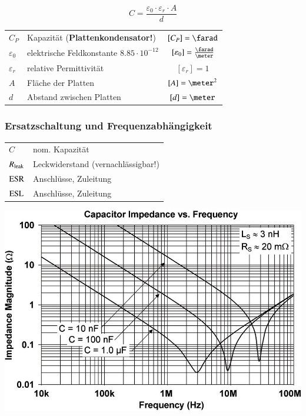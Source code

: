 \begin{minipage}[c]{0.20\columnwidth}
    $$ \boxed{C = \frac{\varepsilon_0 \cdot \varepsilon_r \cdot A}{d}} $$
\end{minipage}
\hfill
\begin{minipage}[c]{0.78\columnwidth}
    \begin{tabular}{llc}
        $C_P$           & Kapazität (\textbf{Plattenkondensator!})          & $[C_P] = \farad$ \\
        $\varepsilon_0$ & elektrische Feldkonstante $8.85 \cdot 10^{-12}$   & $[\varepsilon_0] = \frac{\farad}{\meter}$ \\
        $\varepsilon_r$ & relative Permittivität                            & $[\varepsilon_r] = 1$ \\
        $A$             & Fläche der Platten                                & $[A] = \meter^2$ \\
        $d$             & Abstand zwischen Platten                          & $[d] = \meter$
    \end{tabular}
\end{minipage}


\subsubsection{Ersatzschaltung und Frequenzabhängigkeit}

\begin{minipage}[c]{0.52\columnwidth}
    

    \begin{tabular}{ll@{}}
        $C$             & nom. Kapazität  \\
        $R_{\rm leak}$  & Leckwiderstand (vernachlässigbar!) \\
        $\rm{ESR}$      & Anschlüsse, Zuleitung \\ 
        $\rm{ESL}$      & Anschlüsse, Zuleitung 
    \end{tabular}
\end{minipage}
\hfill
\begin{minipage}[c]{0.46\columnwidth}
    \includegraphics[width=\columnwidth]{images/realer_kondensator_frequenzverlauf.jpg}
\end{minipage}

